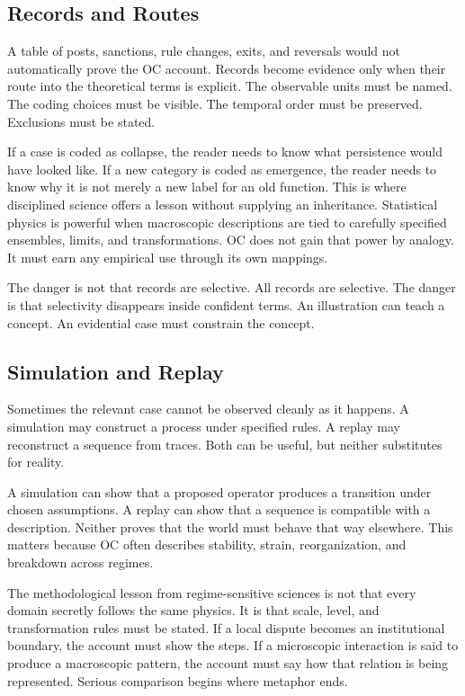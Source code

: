 \documentclass[11pt,a4paper,openany]{book}
\begin{document}
\subsection{Records and Routes}
A table of posts, sanctions, rule changes, exits, and reversals would not automatically prove the OC account. Records become evidence only when their route into the theoretical terms is explicit. The observable units must be named. The coding choices must be visible. The temporal order must be preserved. Exclusions must be stated. \cite{wilson_renormalization,landau_stat_physics}\par
If a case is coded as collapse, the reader needs to know what persistence would have looked like. If a new category is coded as emergence, the reader needs to know why it is not merely a new label for an old function. This is where disciplined science offers a lesson without supplying an inheritance. Statistical physics is powerful when macroscopic descriptions are tied to carefully specified ensembles, limits, and transformations. OC does not gain that power by analogy. It must earn any empirical use through its own mappings.\par
The danger is not that records are selective. All records are selective. The danger is that selectivity disappears inside confident terms. An illustration can teach a concept. An evidential case must constrain the concept.\par
\subsection{Simulation and Replay}
Sometimes the relevant case cannot be observed cleanly as it happens. A simulation may construct a process under specified rules. A replay may reconstruct a sequence from traces. Both can be useful, but neither substitutes for reality. \cite{wilson_renormalization,landau_stat_physics}\par
A simulation can show that a proposed operator produces a transition under chosen assumptions. A replay can show that a sequence is compatible with a description. Neither proves that the world must behave that way elsewhere. This matters because OC often describes stability, strain, reorganization, and breakdown across regimes.\par
The methodological lesson from regime-sensitive sciences is not that every domain secretly follows the same physics. It is that scale, level, and transformation rules must be stated. If a local dispute becomes an institutional boundary, the account must show the steps. If a microscopic interaction is said to produce a macroscopic pattern, the account must say how that relation is being represented. Serious comparison begins where metaphor ends.\par
\end{document}
